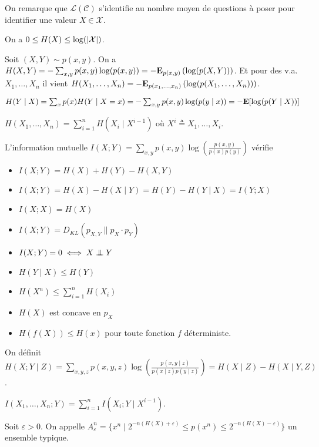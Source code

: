 On remarque que $\mathcal{L}(\mathcal{C})$ s'identifie au nombre moyen de questions à poser pour identifier une valeur $X \in \mathcal{X}$.

\begin{thm}
	On a $0 \leq H(X) \leq \log( \left\lvert\mathcal{X}\right\rvert )$.
\end{thm}

\begin{defn}
	Soit $(X,Y) \sim p(x,y)$.
	On a $H(X,Y) = - \sum_{x,y} p(x,y) \log(p(x,y)) = - \mathbf{E}_{p(x,y)} \left( \log (p(X,Y)) \right)$.
	Et pour des v.a. $X_1, \ldots, X_n$ il vient $H(X_1,\ldots,X_n) = - \mathbf{E}_{p(x_1,\ldots,x_n)} \left( \log( p(X_1,\ldots,X_n)) \right)$.
\end{defn}

\begin{defn}
	$H(Y \mid X)
		= \sum_x p(x) H(Y \mid X = x)
		= - \sum_{x,y} p(x,y) \log(p(y \mid x))
		= - \mathbf{E} [ \log(p(Y \mid X)) ]$
\end{defn}

\begin{thm}
	$H(X_1,\ldots,X_n) = \sum_{i = 1}^n H(X_i \mid X^{i - 1})$ où $X^i \triangleq X_1,\ldots,X_i$.
\end{thm}

\begin{pop}
	L'information mutuelle $I(X;Y) = \sum_{x,y} p(x,y) \log \left( \frac{p(x,y)}{p(x)p(y)} \right)$ vérifie
	\begin{itemize}
		\item[\textbullet] $I(X;Y) = H(X) + H(Y) - H(X,Y)$
		\item[\textbullet] $I(X;Y) = H(X) - H(X \mid Y) = H(Y) - H(Y \mid X) = I(Y;X)$
		\item[\textbullet] $I(X;X) = H(X)$
		\item[\textbullet] $I(X;Y) = D_{KL}( p_{X,Y} \| p_X \cdot p_Y )$
		\item[\textbullet] $I(X;Y) = 0 \iff X \indep Y$
		\item[\textbullet] $H(Y \mid X) \leq H(Y)$
		\item[\textbullet] $H(X^n) \leq \sum_{i = 1}^n H(X_i)$
		\item[\textbullet] $H(X)$ est concave en $p_X$
		\item[\textbullet] $H(f(X)) \leq H(x)$ pour toute fonction $f$ déterministe.
	\end{itemize}
\end{pop}

\begin{defn}
	On définit $H(X ; Y \mid Z) = \sum_{x,y,z} p(x,y,z) \log \left( \frac{p(x,y \mid z)}{p(x \mid z) p(y \mid z)} \right) = H(X \mid Z) - H(X \mid Y, Z)$.
\end{defn}

\begin{thm}
	$I(X_1,\ldots,X_n ; Y) = \sum_{i = 1}^n I(X_i ; Y \mid X^{i - 1})$.
\end{thm}

\begin{defn}
	Soit $\varepsilon > 0$.
	On appelle $A_\varepsilon^n = \{ x^n \mid 2^{-n(H(X) + \varepsilon)} \leq p(x^n) \leq 2^{-n(H(X) - \varepsilon)} \}$ un ensemble typique.
\end{defn}
